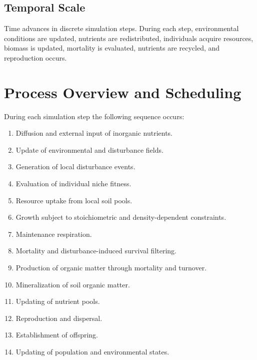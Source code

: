 \subsection{Temporal Scale}

Time advances in discrete simulation steps. During each step, environmental conditions are updated, nutrients are redistributed, individuals acquire resources, biomass is updated, mortality is evaluated, nutrients are recycled, and reproduction occurs.


\section{Process Overview and Scheduling}


During each simulation step the following sequence occurs:

\begin{enumerate}

\item Diffusion and external input of inorganic nutrients.
\item Update of environmental and disturbance fields.
\item Generation of local disturbance events.
\item Evaluation of individual niche fitness.
\item Resource uptake from local soil pools.
\item Growth subject to stoichiometric and density-dependent constraints.
\item Maintenance respiration.
\item Mortality and disturbance-induced survival filtering.
\item Production of organic matter through mortality and turnover.
\item Mineralization of soil organic matter.
\item Updating of nutrient pools.
\item Reproduction and dispersal.
\item Establishment of offspring.
\item Updating of population and environmental states.

\end{enumerate}


